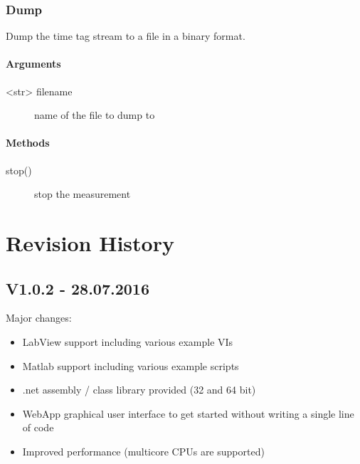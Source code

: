 \documentclass[letterpaper,10pt,english]{sphinxmanual}
\begin{document}
\subsection{Dump}
\label{sections/api:dump}
Dump the time tag stream to a file in a binary format.


\subsubsection{Arguments}
\label{sections/api:id16}\begin{description}
\item[{\textless{}str\textgreater{} filename}] \leavevmode
name of the file to dump to

\end{description}


\subsubsection{Methods}
\label{sections/api:id17}\begin{description}
\item[{stop()}] \leavevmode
stop the measurement

\end{description}


\chapter{Revision History}
\label{sections/changelog:changelog}\label{sections/changelog::doc}\label{sections/changelog:revision-history}

\section{V1.0.2 - 28.07.2016}
\label{sections/changelog:v1-0-2-28-07-2016}
Major changes:
\begin{itemize}
\item {} 
LabView support including various example VIs

\item {} 
Matlab support including various example scripts

\item {} 
.net assembly / class library provided (32 and 64 bit)

\item {} 
WebApp graphical user interface to get started without writing a single line of code

\item {} 
Improved performance (multicore CPUs are supported)

\end{itemize}
\end{document}
